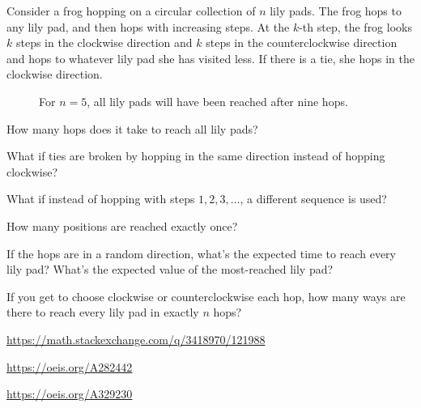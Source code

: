 \documentclass{article}
\begin{document}
Consider a frog hopping on a circular collection of $n$ lily pads. The frog hops to
any lily pad, and then hops with increasing steps. At the $k$-th step, the frog
looks $k$ steps in the clockwise direction and $k$ steps in the counterclockwise
direction and hops to whatever lily pad she has visited less. If there is a tie,
she hops in the clockwise direction.

\begin{figure}[ht!]
  \centering
  \caption{For $n = 5$, all lily pads will have been reached after nine hops.}
\end{figure}

\begin{question}
  How many hops does it take to reach all lily pads?
\end{question}

\begin{related}
  \item What if ties are broken by hopping in the same direction instead of
  hopping clockwise?
  \item What if instead of hopping with steps $1, 2, 3, \dots$, a different
  sequence is used?
  \item How many positions are reached exactly once?
  \item If the hops are in a random direction, what's the expected time to reach
  every lily pad? What's the expected value of the most-reached lily pad?
  \item If you get to choose clockwise or counterclockwise each hop, how many
  ways are there to reach every lily pad in exactly $n$ hops?
\end{related}

\begin{references}
  \item \url{https://math.stackexchange.com/q/3418970/121988}
  \item \url{https://oeis.org/A282442}
  \item \url{https://oeis.org/A329230}
\end{references}
\end{document}

